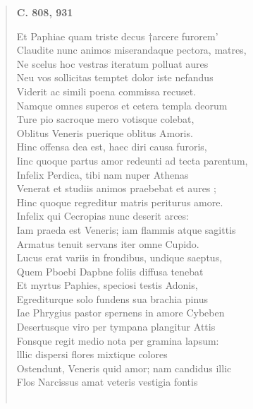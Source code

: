 \documentclass[11pt, a4paper]{report}
\begin{document}
\begin{verse}
     \marginpar{[286]} \begin{center} \textbf{C. 808, 931} \end{center}Et Paphiae quam triste decus †arcere furorem’ \\ Claudite nunc animos miserandaque pectora, matres, \\ Ne scelus hoc vestras iteratum polluat aures \\ Neu vos sollicitas temptet dolor iste nefandus \\ Viderit ac simili poena commissa recuset. \\ Namque omnes superos et cetera templa deorum \\ Ture pio sacroque mero votisque colebat, \\ Oblitus Veneris puerique oblitus Amoris. \\ Hinc offensa dea est, haec diri causa furoris, \\ Iinc quoque partus amor redeunti ad tecta parentum, \\ Infelix Perdica, tibi nam nuper Athenas \\ Venerat et studiis animos praebebat et aures ; \\ Hinc quoque regreditur matris periturus amore. \\ Infelix qui Cecropias nunc deserit arces: \\ Iam praeda est Veneris; iam flammis atque sagittis \\ Armatus tenuit servans iter omne Cupido. \\ Lucus erat variis in frondibus, undique saeptus, \\ Quem Pboebi Dapbne foliis diffusa tenebat \\ Et myrtus Paphies, speciosi testis Adonis, \\ Egrediturque solo fundens sua brachia pinus \\ Iae Phrygius pastor spernens in amore Cybeben \\ Desertusque viro per tympana plangitur Attis \\ Fonsque regit medio nota per gramina lapsum: \\ lllic dispersi flores mixtique colores \\ Ostendunt, Veneris quid amor; nam candidus illic \\ Flos Narcissus amat veteris vestigia fontis \\ 
        ﻿\pagebreak 

\end{verse}
\end{document}
